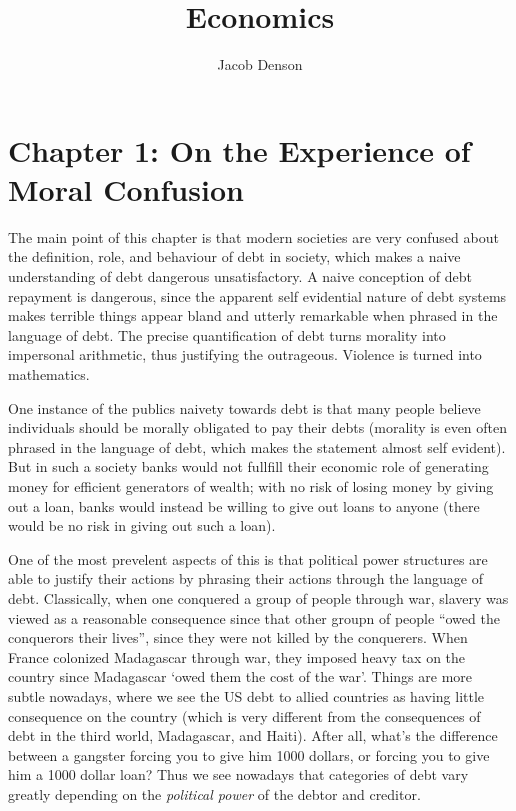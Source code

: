 

\title{Economics}
\author{Jacob Denson}



\maketitle
\tableofcontents
{}

\chapter{Chapter 1: On the Experience of Moral Confusion}

The main point of this chapter is that modern societies are very confused about the definition, role, and behaviour of debt in society, which makes a naive understanding of debt dangerous unsatisfactory. A naive conception of debt repayment is dangerous, since the apparent self evidential nature of debt systems makes terrible things appear bland and utterly remarkable when phrased in the language of debt. The precise quantification of debt turns morality into impersonal arithmetic, thus justifying the outrageous. Violence is turned into mathematics.

One instance of the publics naivety towards debt is that many people believe individuals should be morally obligated to pay their debts (morality is even often phrased in the language of debt, which makes the statement almost self evident). But in such a society banks would not fullfill their economic role of generating money for efficient generators of wealth; with no risk of losing money by giving out a loan, banks would instead be willing to give out loans to anyone (there would be no risk in giving out such a loan).

One of the most prevelent aspects of this is that political power structures are able to justify their actions by phrasing their actions through the language of debt. Classically, when one conquered a group of people through war, slavery was viewed as a reasonable consequence since that other groupn of people ``owed the conquerors their lives'', since they were not killed by the conquerers. When France colonized Madagascar through war, they imposed heavy tax on the country since Madagascar `owed them the cost of the war'. Things are more subtle nowadays, where we see the US debt to allied countries as having little consequence on the country (which is very different from the consequences of debt in the third world, Madagascar, and Haiti). After all, what's the difference between a gangster forcing you to give him 1000 dollars, or forcing you to give him a 1000 dollar loan? Thus we see nowadays that categories of debt vary greatly depending on the \emph{political power} of the debtor and creditor.

